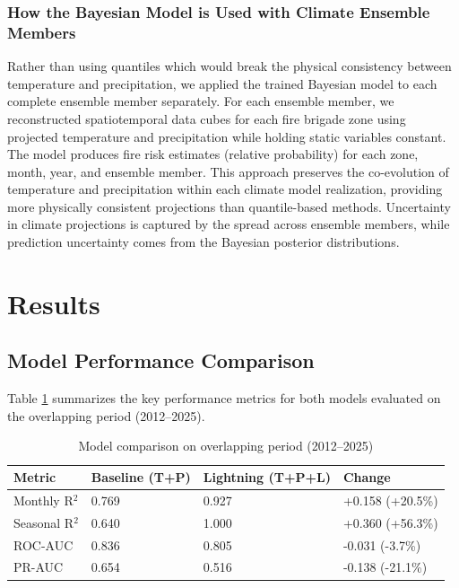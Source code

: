 \documentclass[11pt,a4paper]{article}
\begin{document}
\subsubsection{How the Bayesian Model is Used with Climate Ensemble Members}

Rather than using quantiles which would break the physical consistency between temperature and precipitation, we applied the trained Bayesian model to each complete ensemble member separately. For each ensemble member, we reconstructed spatiotemporal data cubes for each fire brigade zone using projected temperature and precipitation while holding static variables constant. The model produces fire risk estimates (relative probability) for each zone, month, year, and ensemble member. This approach preserves the co-evolution of temperature and precipitation within each climate model realization, providing more physically consistent projections than quantile-based methods. Uncertainty in climate projections is captured by the spread across ensemble members, while prediction uncertainty comes from the Bayesian posterior distributions.

\section{Results}

\subsection{Model Performance Comparison}

Table \ref{tab:comparison} summarizes the key performance metrics for both models evaluated on the overlapping period (2012--2025).

\begin{table}[H]
\centering
\caption{Model comparison on overlapping period (2012--2025)}
\label{tab:comparison}
\begin{tabular}{llll}
\toprule
\textbf{Metric} & \textbf{Baseline (T+P)} & \textbf{Lightning (T+P+L)} & \textbf{Change} \\
\midrule
Monthly R$^2$ & 0.769 & 0.927 & +0.158 (+20.5\%) \\
Seasonal R$^2$ & 0.640 & 1.000 & +0.360 (+56.3\%) \\
ROC-AUC & 0.836 & 0.805 & -0.031 (-3.7\%) \\
PR-AUC & 0.654 & 0.516 & -0.138 (-21.1\%) \\
\bottomrule
\end{tabular}
\end{table}
\end{document}
